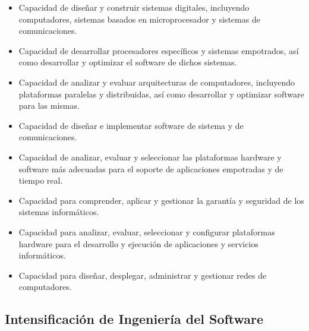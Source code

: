 \documentclass{pre-tfg}
\begin{document}
\begin{itemize}
\item Capacidad de diseñar y construir sistemas digitales, incluyendo computadores,
  sistemas basados en microprocesador y sistemas de comunicaciones.
\item Capacidad de desarrollar procesadores específicos y sistemas empotrados, así como
  desarrollar y optimizar el software de dichos sistemas.
\item Capacidad de analizar y evaluar arquitecturas de computadores, incluyendo
  plataformas paralelas y distribuidas, así como desarrollar y optimizar software para las
  mismas.
\item Capacidad de diseñar e implementar software de sistema y de comunicaciones.
\item Capacidad de analizar, evaluar y seleccionar las plataformas hardware y software más
  adecuadas para el soporte de aplicaciones empotradas y de tiempo real.
\item Capacidad para comprender, aplicar y gestionar la garantía y seguridad de los sistemas informáticos.
\item Capacidad para analizar, evaluar, seleccionar y configurar plataformas hardware para
  el desarrollo y ejecución de aplicaciones y servicios informáticos.
\item Capacidad para diseñar, desplegar, administrar y gestionar redes de computadores.
\end{itemize}


\subsection*{Intensificación de Ingeniería del Software}
\end{document}
